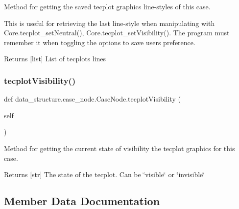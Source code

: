 Method for getting the saved tecplot graphics line-\/styles of this case. 

This is useful for retrieving the last line-\/style when manipulating with Core.\+tecplot\+\_\+set\+Neutral(), Core.\+tecplot\+\_\+set\+Visibility(). The program must remember it when toggling the options to save user\textquotesingle{}s preference.

\begin{DoxyReturn}{Returns}
\mbox{[}list\mbox{]} List of tecplots lines 
\end{DoxyReturn}
\hypertarget{classdata__structure_1_1case__node_1_1_case_node_aeb90281663e7094357befb23383a0d12}{}\label{classdata__structure_1_1case__node_1_1_case_node_aeb90281663e7094357befb23383a0d12} 
\subsubsection{\texorpdfstring{tecplot\+Visibility()}{tecplotVisibility()}}
{\footnotesize\ttfamily def data\+\_\+structure.\+case\+\_\+node.\+Case\+Node.\+tecplot\+Visibility (\begin{DoxyParamCaption}\item[{}]{self }\end{DoxyParamCaption})}



Method for getting the current state of visibility the tecplot graphics for this case. 

\begin{DoxyReturn}{Returns}
\mbox{[}str\mbox{]} The state of the tecplot. Can be \char`\"{}visible\char`\"{} or \char`\"{}invisible\char`\"{} 
\end{DoxyReturn}


\subsection{Member Data Documentation}
\hypertarget{classdata__structure_1_1case__node_1_1_case_node_ac2f5b0ae9715edeac8f9b1ccc0fd64e3}{}\label{classdata__structure_1_1case__node_1_1_case_node_ac2f5b0ae9715edeac8f9b1ccc0fd64e3} 
